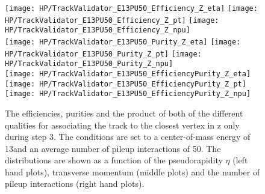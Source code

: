 \begin{figure}[!h]
  \centering
  \texttt{[image: HP/TrackValidator\_E13PU50\_Efficiency\_Z\_eta]}
  \texttt{[image: HP/TrackValidator\_E13PU50\_Efficiency\_Z\_pt]}
  \texttt{[image: HP/TrackValidator\_E13PU50\_Efficiency\_Z\_npu]}
   \\
  \texttt{[image: HP/TrackValidator\_E13PU50\_Purity\_Z\_eta]}
  \texttt{[image: HP/TrackValidator\_E13PU50\_Purity\_Z\_pt]}
  \texttt{[image: HP/TrackValidator\_E13PU50\_Purity\_Z\_npu]}
   \\
  \texttt{[image: HP/TrackValidator\_E13PU50\_EfficiencyPurity\_Z\_eta]}
  \texttt{[image: HP/TrackValidator\_E13PU50\_EfficiencyPurity\_Z\_pt]}
  \texttt{[image: HP/TrackValidator\_E13PU50\_EfficiencyPurity\_Z\_npu]}
  \caption[Efficiencies, purities and their product of the different qualities of the association map with associating the track to the closest vertex in z only during step 3 with 13\TeV and $\left<PU\right>=50$]{The efficiencies, purities and the product of both of the different qualities for associating the track to the closest vertex in z only during step 3. The conditions are set to a center-of-mass energy of 13\TeV and an average number of pileup interactions of 50. The distributions are shown as a function of the pseudorapidity $\eta$ (left hand plots), transverse momentum (middle plots) and the number of pileup interactions (right hand plots).}
\end{figure}
\clearpage

